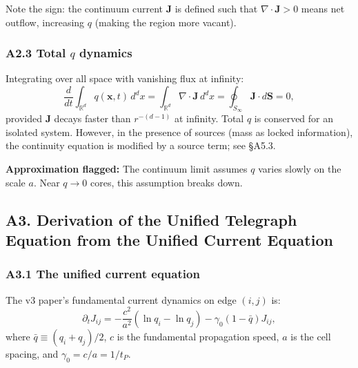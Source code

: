 \documentclass[reprint]{revtex4-2}
\begin{document}
Note the sign: the continuum current $\mathbf{J}$ is defined such that $\nabla\cdot\mathbf{J}>0$ means net outflow, increasing $q$ (making the region more vacant).

\subsubsection{A2.3 Total $q$ dynamics}

Integrating over all space with vanishing flux at infinity:
\begin{equation}
\frac{d}{dt}\int_{\mathbb{R}^d} q(\mathbf{x},t)\,d^d x = \int_{\mathbb{R}^d} \nabla\cdot\mathbf{J}\,d^d x = \oint_{S_\infty} \mathbf{J}\cdot d\mathbf{S} = 0,
\end{equation}
provided $\mathbf{J}$ decays faster than $r^{-(d-1)}$ at infinity. Total $q$ is conserved for an isolated system. However, in the presence of sources (mass as locked information), the continuity equation is modified by a source term; see \S A5.3.

\textbf{Approximation flagged:} The continuum limit assumes $q$ varies slowly on the scale $a$. Near $q\to 0$ cores, this assumption breaks down.

\subsection{A3. Derivation of the Unified Telegraph Equation from the Unified Current Equation}

\subsubsection{A3.1 The unified current equation}

The v3 paper's fundamental current dynamics on edge $(i,j)$ is:
\begin{equation}
\partial_t J_{ij} = -\frac{c^2}{a^2}(\ln q_i - \ln q_j) - \gamma_0(1-\bar{q})J_{ij},
\label{eq:a3_current}
\end{equation}
where $\bar{q} \equiv (q_i+q_j)/2$, $c$ is the fundamental propagation speed, $a$ is the cell spacing, and $\gamma_0 = c/a = 1/t_P$.
\end{document}
